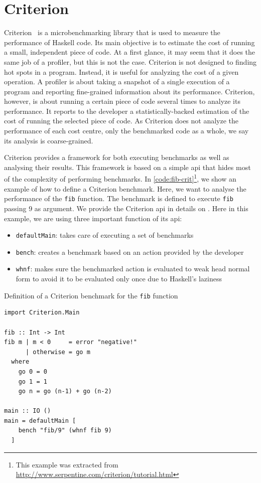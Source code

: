 \section{Criterion}\label{sec:criterion}
Criterion~\citep{sullivan:2009} is a microbenchmarking library that is used to measure the performance of Haskell code. Its main objective is to estimate the cost of running a small, independent piece of code. At a first glance, it may seem that it does the same job of a profiler, but this is not the case. Criterion is not designed to finding hot spots in a program. Instead, it is useful for analyzing the cost of a given operation. A profiler is about taking a snapshot of a single execution of a program and reporting fine-grained information about its performance. Criterion, however, is about running a certain piece of code several times to analyze its performance. It reports to the developer a statistically-backed estimation of the cost of running the selected piece of code. As Criterion does not analyze the performance of each cost centre, only the benchmarked code as a whole, we say its analysis is coarse-grained.

Criterion provides a framework for both executing benchmarks as well as analysing their results. This framework is based on a simple \ac{api} that hides most of the complexity of performing benchmarks. In \autoref{code:fib-crit}\footnote{This example was extracted from \url{http://www.serpentine.com/criterion/tutorial.html}}, we show an example of how to define a Criterion benchmark. Here, we want to analyse the performance of the \texttt{fib} function. The benchmark is defined to execute \texttt{fib} passing 9 as argument. We provide the Criterion \ac{api} in details on . Here in this example, we are using three important function of its \ac{api}:
\begin{itemize}
  \item \texttt{defaultMain}: takes care of executing a set of benchmarks
  \item \texttt{bench}: creates a benchmark based on an action provided by the developer
  \item \texttt{whnf}: makes sure the benchmarked action is evaluated to weak head normal form to avoid it to be evaluated only once due to Haskell's laziness
\end{itemize}

\begin{listing}
  \caption{Definition of a Criterion benchmark for the \texttt{fib} function}
  \begin{verbatim}
import Criterion.Main

fib :: Int -> Int
fib m | m < 0     = error "negative!"
      | otherwise = go m
  where
    go 0 = 0
    go 1 = 1
    go n = go (n-1) + go (n-2)

main :: IO ()
main = defaultMain [
    bench "fib/9" (whnf fib 9)
  ]
  \end{verbatim}
  \label{code:fib-crit}
\end{listing}

